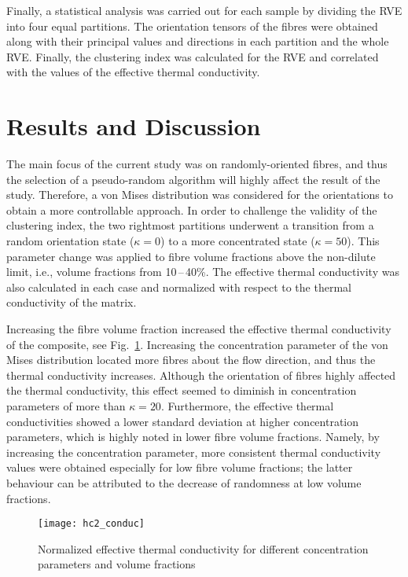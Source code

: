 \bl
Finally, a statistical analysis was carried out for each sample by dividing the RVE into four equal partitions. The orientation tensors of the fibres were obtained along with their principal values and directions in each partition and the whole RVE. Finally, the clustering index was calculated for the RVE and correlated with the values of the effective thermal conductivity.  

\section{Results and Discussion}
	The main focus of the current study was on randomly-oriented fibres, and thus the selection of a pseudo-random algorithm will highly affect the result of the study. Therefore, a von Mises distribution was considered for the orientations to obtain a more controllable approach. In order to challenge the validity of the clustering index, the two rightmost partitions underwent a transition from a random orientation state ($\kappa=0$) to a more concentrated state ($\kappa=50$). This parameter change was applied to fibre volume fractions above the non-dilute limit, i.e., volume fractions from 10\,--\,40\%. The effective thermal conductivity was also calculated in each case and normalized with respect to the thermal conductivity of the matrix.

	Increasing the fibre volume fraction increased the effective thermal conductivity of the composite, see Fig.~\ref{fig:cond5}. Increasing the concentration parameter of the von Mises distribution located more fibres about the flow direction, and thus the thermal conductivity increases. Although the orientation of fibres highly affected the thermal conductivity, this effect seemed to diminish in concentration parameters of more than $\kappa=20$. Furthermore, the effective thermal conductivities showed a lower standard deviation at higher concentration parameters, which is highly noted in lower fibre volume fractions. Namely, by increasing the concentration parameter, more consistent thermal conductivity values were obtained especially for low fibre volume fractions; the latter behaviour can be attributed to the decrease of randomness at low volume fractions.

\begin{figure}[!h]
  \centering
	\texttt{[image: hc2\_conduc]}
  \caption{Normalized effective thermal conductivity for different concentration parameters and volume fractions}
  \label{fig:cond5}
\end{figure}%


